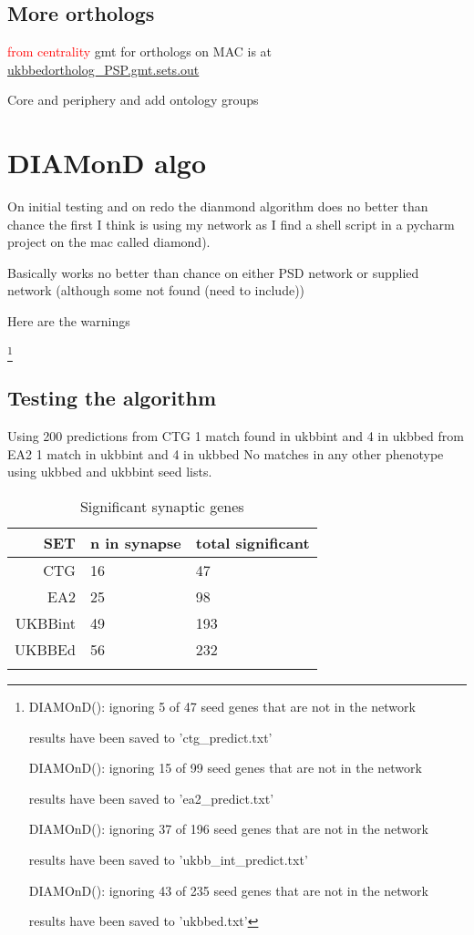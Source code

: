 \subsection{More orthologs}
\textcolor{red}{from centrality}
gmt for orthologs on MAC is at \url{ukbbedortholog_PSP.gmt.sets.out }

Core and periphery
and add ontology groups



\section{DIAMonD algo}

On initial testing and on redo the dianmond algorithm does no better than chance the first I think is using my network as I find a shell script in a pycharm project on the mac called diamond).

Basically works no better than chance on either PSD network or supplied network (although some not found (need to include))

Here are the warnings

\footnote{DIAMOnD(): ignoring 5 of 47 seed genes that are not in the network

 results have been saved to 'ctg\_predict.txt' 

DIAMOnD(): ignoring 15 of 99 seed genes that are not in the network

 results have been saved to 'ea2\_predict.txt' 

DIAMOnD(): ignoring 37 of 196 seed genes that are not in the network

 results have been saved to 'ukbb\_int\_predict.txt' 

DIAMOnD(): ignoring 43 of 235 seed genes that are not in the network

 results have been saved to 'ukbbed.txt' }

\subsection{Testing the algorithm}
 Using 200 predictions from CTG 1 match found in ukbbint and 4 in ukbbed
 from EA2 1 match in ukbbint and 4 in ukbbed
 No matches in any other phenotype using ukbbed and ukbbint seed lists.
 \begin{table}[ht]
\centering
\begin{tabular}{rll}
  \hline
  SET & n in synapse & total significant\\ 
  \hline
 CTG & 16 &47\\
 EA2 & 25 & 98\\
 UKBBint & 49 & 193\\
  UKBBEd & 56 & 232\\
  \\ 
 
   \hline
\end{tabular}
\caption{Significant synaptic genes}
\label{table:MAGMA_Gene_result_significant synaptic genes}
\end{table}

